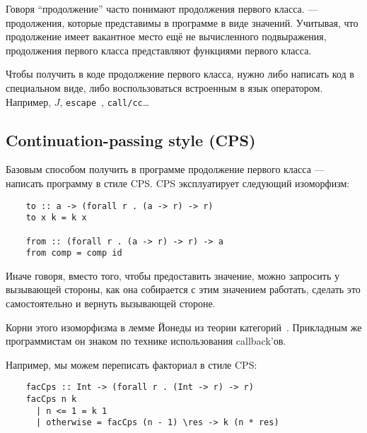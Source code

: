 Говоря ``продолжение'' часто понимают продолжения первого класса.
 --- продолжения, которые представимы в программе в виде значений.
Учитывая, что продолжение имеет вакантное место ещё не вычисленного подвыражения, продолжения первого класса представляют функциями первого класса.

Чтобы получить в коде продолжение первого класса, нужно либо написать код в специальном виде, либо воспользоваться встроенным в язык оператором.
Например, $J$, \texttt{escape}~\cite{reynolds1972definitional}, \texttt{call/cc}\ldots











\subsection{Continuation-passing style (CPS)}

Базовым способом получить в программе продолжение первого класса --- написать программу в стиле CPS.
CPS эксплуатирует следующий изоморфизм:
\begin{verbatim}
    to :: a -> (forall r . (a -> r) -> r)
    to x k = k x

    from :: (forall r . (a -> r) -> r) -> a
    from comp = comp id
\end{verbatim}

Иначе говоря, вместо того, чтобы предоставить значение, можно запросить у вызывающей стороны, как она собирается с этим значением работать, сделать это самостоятельно и вернуть вызывающей стороне.

Корни этого изоморфизма в лемме Йонеды из теории категорий~\cite{hinze2010reason}.
Прикладным же программистам он знаком по технике использования callback'ов.

Например, мы можем переписать факториал в стиле CPS:
\begin{verbatim}
    facCps :: Int -> (forall r . (Int -> r) -> r)
    facCps n k
      | n <= 1 = k 1
      | otherwise = facCps (n - 1) \res -> k (n * res)
\end{verbatim}

